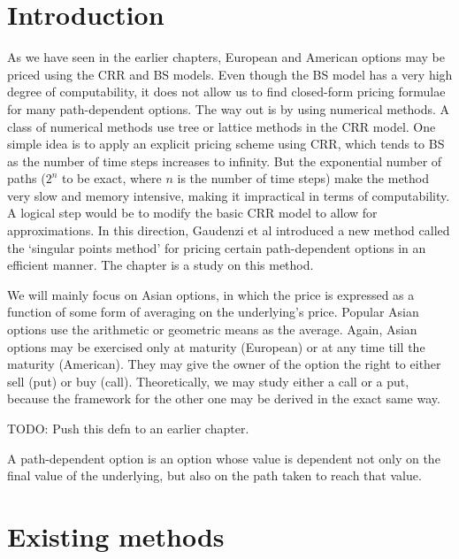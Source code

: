 

\section{Introduction}
\label{sec:sp-asian-intro}
As we have seen in the earlier chapters, European and American options may be priced using the CRR and BS models. Even though the BS model has a very high degree of computability, it does not allow us to find closed-form pricing formulae for many path-dependent options. The way out is by using numerical methods. A class of numerical methods use tree or lattice methods in the CRR model. One simple idea is to apply an explicit pricing scheme using CRR, which tends to BS as the number of time steps increases to infinity. But the exponential number of paths ($2^n$ to be exact, where $n$ is the number of time steps) make the method very slow and memory intensive, making it impractical in terms of computability. A logical step would be to modify the basic CRR model to allow for approximations. In this direction, Gaudenzi et al\cite{Gaudenzi2010} introduced a new method called the `singular points method' for pricing certain path-dependent options in an efficient manner. The chapter is a study on this method.

We will mainly focus on Asian options, in which the price is expressed as a function of some form of averaging on the underlying's price. Popular Asian options use the arithmetic or geometric means as the average. Again, Asian options may be exercised only at maturity (European) or at any time till the maturity (American). They may give the owner of the option the right to either sell (put) or buy (call). Theoretically, we may study either a call or a put, because the framework for the other one may be derived in the exact same way.

TODO: Push this defn to an earlier chapter.
\begin{dfn}
	A path-dependent option is an option whose value is dependent not only on the final value of the underlying, but also on the path taken to reach that value.
\end{dfn}



\section{Existing methods}
\label{sec:existing-methods}

